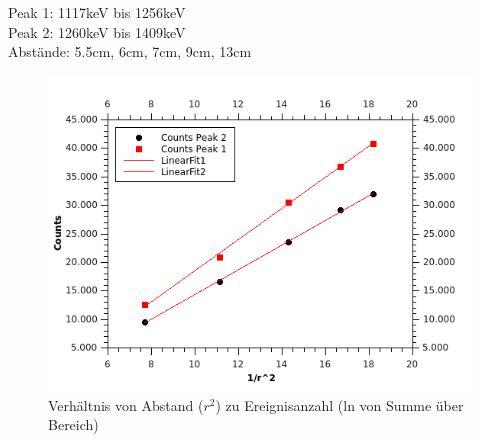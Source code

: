 \documentclass[12pt,a4paper]{article}
\begin{document}
\begin{multicols}{2}
Peak 1: 1117keV bis 1256keV\\
Peak 2: 1260keV bis 1409keV\\
Abstände: 5.5cm, 6cm, 7cm, 9cm, 13cm\\
\begin{figure}[H]
	\centering
	\includegraphics[scale=1.5]{./figures/Endergebniss_Abstand_mitFits.png}
	\caption{Verhältnis von Abstand ($r^2$) zu Ereignisanzahl (ln von Summe über Bereich)}
	\label{fig:abstandsgesetz_erg}
\end{figure}


\end{multicols}
\end{document}
